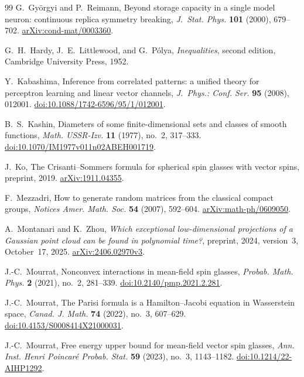 \documentclass[11pt]{article}
\numberwithin{equation}{section}
\theoremstyle{definition}
\begin{document}
\begin{thebibliography}{99}
G.~Gy\"orgyi and P.~Reimann, Beyond storage capacity in a single model neuron: continuous replica symmetry breaking,
\emph{J.~Stat. Phys.} \textbf{101} (2000), 679--702.
\href{https://arxiv.org/abs/cond-mat/0003360}{arXiv:cond-mat/0003360}.

G.~H.~Hardy, J.~E.~Littlewood, and G.~P\'olya,
\emph{Inequalities}, second edition, Cambridge University Press, 1952.

Y.~Kabashima, Inference from correlated patterns: a unified theory for perceptron learning and linear vector channels,
\emph{J.~Phys.: Conf. Ser.} \textbf{95} (2008), 012001.
\href{https://doi.org/10.1088/1742-6596/95/1/012001}{doi:10.1088/1742-6596/95/1/012001}.

B.~S.~Kashin, Diameters of some finite-dimensional sets and classes of smooth functions,
\emph{Math. USSR-Izv.} \textbf{11} (1977), no.~2, 317--333.
\href{https://doi.org/10.1070/IM1977v011n02ABEH001719}{doi:10.1070/IM1977v011n02ABEH001719}.

J.~Ko, The Crisanti--Sommers formula for spherical spin glasses with vector spins,
preprint, 2019.
\href{https://arxiv.org/abs/1911.04355}{arXiv:1911.04355}.

F.~Mezzadri, How to generate random matrices from the classical compact groups,
\emph{Notices Amer. Math. Soc.} \textbf{54} (2007), 592--604.
\href{https://arxiv.org/abs/math-ph/0609050}{arXiv:math-ph/0609050}.

A.~Montanari and K.~Zhou,
\emph{Which exceptional low-dimensional projections of a Gaussian point cloud can be found in polynomial time?},
preprint, 2024, version~3, October~17, 2025.
\href{https://arxiv.org/abs/2406.02970v3}{arXiv:2406.02970v3}.

J.-C.~Mourrat, Nonconvex interactions in mean-field spin glasses,
\emph{Probab. Math. Phys.} \textbf{2} (2021), no.~2, 281--339.
\href{https://doi.org/10.2140/pmp.2021.2.281}{doi:10.2140/pmp.2021.2.281}.

J.-C.~Mourrat, The Parisi formula is a Hamilton--Jacobi equation in Wasserstein space,
\emph{Canad. J. Math.} \textbf{74} (2022), no.~3, 607--629.
\href{https://doi.org/10.4153/S0008414X21000031}{doi:10.4153/S0008414X21000031}.

J.-C.~Mourrat, Free energy upper bound for mean-field vector spin glasses,
\emph{Ann. Inst. Henri Poincar\'e Probab. Stat.} \textbf{59} (2023), no.~3, 1143--1182.
\href{https://doi.org/10.1214/22-AIHP1292}{doi:10.1214/22-AIHP1292}.


\end{thebibliography}
\end{document}

